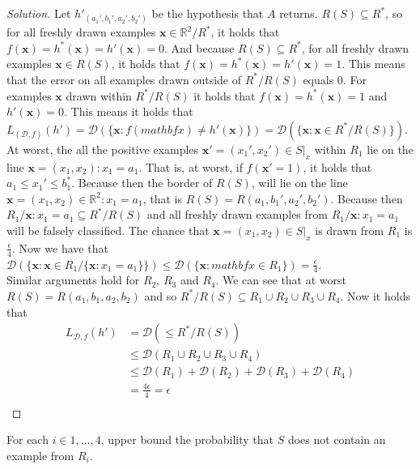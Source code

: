 \documentclass[10pt, a4paper, twoside]{amsart}
\newcommand{\R}{\ensuremath{\mathbb{R}}}
\newenvironment{solution}
               {\let\oldqedsymbol=\qedsymbol
                \renewcommand{\qedsymbol}{$\blacktriangleleft$}
                \begin{proof}[Solution]}
               {\end{proof}
                \renewcommand{\qedsymbol}{\oldqedsymbol}}
\begin{document}
\begin{solution}
  Let $h'_{(a_1',b_1',a_2',b_2')}$ be the hypothesis that $A$ returns. $R(S)\subseteq R^*$, so for all freshly drawn examples $\mathbf{x} \in \R^2/R^*$,  it holds that $f(\mathbf{x})=h^*(\mathbf{x}) = h'(\mathbf{x}) = 0$. And because $R(S)\subseteq R^*$, for all freshly drawn examples $\mathbf{x} \in R(S)$, it holds that $f(\mathbf{x})=h^*(\mathbf{x}) = h'(\mathbf{x}) = 1$. This means that the error on all examples drawn outside of $R^*/R(S)$ equals $0$. For examples $\mathbf{x}$ drawn within $R^*/R(S)$ it holds that $f(\mathbf{x})=h^*(\mathbf{x}) = 1$ and $h'(\mathbf{x}) = 0$. This means it holds that $L_{(\mathcal{D},f)}(h') = \mathcal{D}(\{\mathbf{x}: f(mathbf{x}) \neq h'(\mathbf{x})\}) = \mathcal{D}(\{\mathbf{x}:\mathbf{x}\in R^*/R(S)\})$. \\
  At worst, the all the positive examples $\mathbf{x'} = (x_1',x_2') \in S|_x$ within $R_1$ lie on the line $\mathbf{x}=(x_1,x_2):x_1 = a_1$. That is, at worst, if $f(\mathbf{x'} = 1)$, it holds that $a_1\leq x_1' \leq b_1^*$. Because then the border of $R(S)$, will lie on the line $\mathbf{x} = (x_1,x_2) \in \R^2: x_1 = a_1$, that is $R(S) = R(a_1,b_1',a_2',b_2')$. Because then $R_{1}/{\mathbf{x}:x_1=a_1} \subseteq R^*/R(S)$ and all freshly drawn examples from $R_{1}/{\mathbf{x}:x_1=a_1}$ will be falsely classified. The chance that $\mathbf{x} = (x_1,x_2) \in S|_x$ is drawn from $R_1$ is $\frac{\epsilon}{4}$. Now we have that $\mathcal{D}(\{\mathbf{x}: \mathbf{x} \in R_{1}/\{\mathbf{x}:x_1=a_1\}\}) \leq \mathcal{D}(\{\mathbf{x}: mathbf{x} \in R_{1}\}) = \frac{\epsilon}{4}$.\\
  Similar arguments hold for $R_2$, $R_3$ and $R_4$. We can see that at worst $R(S) = R(a_1,b_1,a_2,b_2)$ and so $R^*/R(S) \subseteq R_1 \cup R_2 \cup R_3 \cup R_4$. Now it holds that
\begin{align*}
  L_{\mathcal{D},f}(h') & = \mathcal{D}(\leq R^*/R(S)) \\
                      & \leq \mathcal{D}(R_1 \cup R_2 \cup R_3 \cup R_4) \\
                      & \leq \mathcal{D}(R_1) + \mathcal{D}(R_2) + \mathcal{D}(R_3) + \mathcal{D}(R_4)\\
 & = \frac{4\epsilon}{4} = \epsilon \\
\end{align*}  
\end{solution}
For each $i \in {1,\ldots,4}$, upper bound the probability that $S$ does not contain an example from $R_i$.\\
\end{document}
